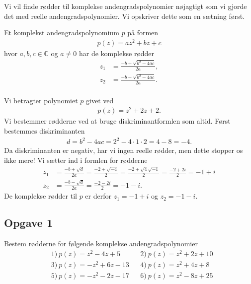 Vi vil finde rødder til komplekse andengradspolynomier nøjagtigt som vi gjorde det med reelle andengradspolynomier. Vi opskriver dette som en sætning først.
\begin{setn}\label{setn:rodformel}
	Et komplekst andengradspolynomium $p$ på formen
	\begin{align*}
		p(z) = az^2 + bz + c
	\end{align*}
	hvor $a,b,c\in \mathbb{C}$ og $a \neq 0$ har de komplekse rødder
	\begin{align*}
		z_1 &= \frac{-b + \sqrt{b^2 - 4ac}}{2a},\\
		z_2 &= \frac{-b - \sqrt{b^2 - 4ac}}{2a}.\\
	\end{align*}
\end{setn}
\begin{exa}
	Vi betragter polynomiet $p$ givet ved
	\begin{align*}
		p(z) = z^2 + 2z + 2.
	\end{align*}
	Vi bestemmer rødderne ved at bruge diskriminantformlen som altid. Først bestemmes diskriminanten
	\begin{align*}
		d = b^2 - 4ac = 2^2 - 4\cdot 1\cdot 2 = 4 - 8 = -4.
	\end{align*}
	Da diskriminanten er negativ, har vi ingen reelle rødder, men dette stopper os ikke mere! Vi sætter ind i formlen 
	for rødderne
	\begin{align*}
		z_1 &= \frac{-b + \sqrt{d}}{2a} = \frac{-2 + \sqrt{-4}}{2} = \frac{-2+\sqrt{4}\sqrt{-1}}{2} 
		= \frac{-2 + 2i}{2} = -1+i\\
		z_2 &=\frac{-b - \sqrt{d}}{2a} = \frac{-2 - 2i}{2} = -1 - i. 
	\end{align*}
	De komplekse rødder til $p$ er derfor $z_1 = -1 + i $ og $z_2 = -1 - i$. 
\end{exa}

\subsection*{Opgave 1}
Bestem rødderne for følgende komplekse andengradspolynomier
\begin{align*}
	&1) \ p(z) = z^2 - 4z + 5 &&2) \ p(z) = z^2 + 2z + 10 \\
	&3) \ p(z) = -z^2 + 6z - 13 &&4) \ p(z) = z^2 + 4z + 8 \\
	&5) \ p(z) = -z^2 - 2z - 17 &&6) \ p(z) = z^2 - 8z + 25
\end{align*}

